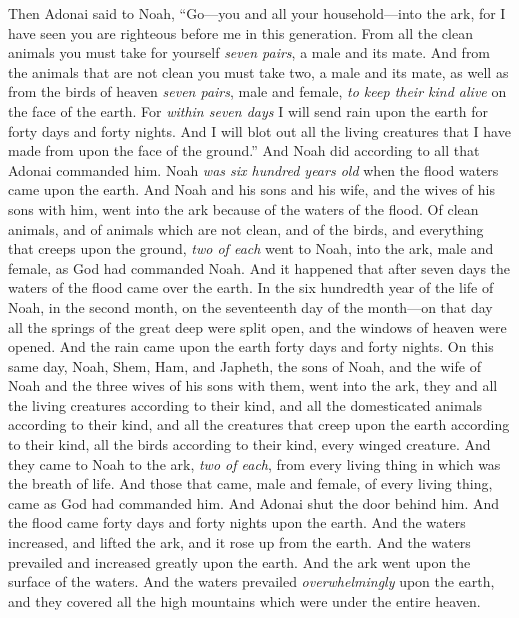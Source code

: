 \begin{biblechapter} %
\verse Then Adonai said to Noah, “Go—you and all your household—into the ark, for I have seen you are righteous before me in this generation.
\verse From all the clean animals you must take for yourself \textit{seven pairs}, a male and its mate. And from the animals that are not clean you must take two, a male and its mate,
\verse as well as from the birds of heaven \textit{seven pairs}, male and female, \textit{to keep their kind alive} on the face of the earth.
\verse For \textit{within seven days} I will send rain upon the earth for forty days and forty nights. And I will blot out all the living creatures that I have made from upon the face of the ground.”
\verse And Noah did according to all that Adonai commanded him.
 Noah \textit{was six hundred years old} when the flood waters came upon the earth.
\verse And Noah and his sons and his wife, and the wives of his sons with him, went into the ark because of the waters of the flood.
\verse Of clean animals, and of animals which are not clean, and of the birds, and everything that creeps upon the ground,
\verse \textit{two of each} went to Noah, into the ark, male and female, as God had commanded Noah.
\verse And it happened that after seven days the waters of the flood came over the earth.
\verse In the six hundredth year of the life of Noah, in the second month, on the seventeenth day of the month—on that day all the springs of the great deep were split open, and the windows of heaven were opened.
\verse And the rain came upon the earth forty days and forty nights.
\verse On this same day, Noah, Shem, Ham, and Japheth, the sons of Noah, and the wife of Noah and the three wives of his sons with them, went into the ark,
\verse they and all the living creatures according to their kind, and all the domesticated animals according to their kind, and all the creatures that creep upon the earth according to their kind, all the birds according to their kind, every winged creature.
\verse And they came to Noah to the ark, \textit{two of each}, from every living thing in which was the breath of life.
\verse And those that came, male and female, of every living thing, came as God had commanded him. And Adonai shut the door behind him.
\verse And the flood came forty days and forty nights upon the earth. And the waters increased, and lifted the ark, and it rose up from the earth.
\verse And the waters prevailed and increased greatly upon the earth. And the ark went upon the surface of the waters.
\verse And the waters prevailed \textit{overwhelmingly} upon the earth, and they covered all the high mountains which were under the entire heaven.

\end{biblechapter}
